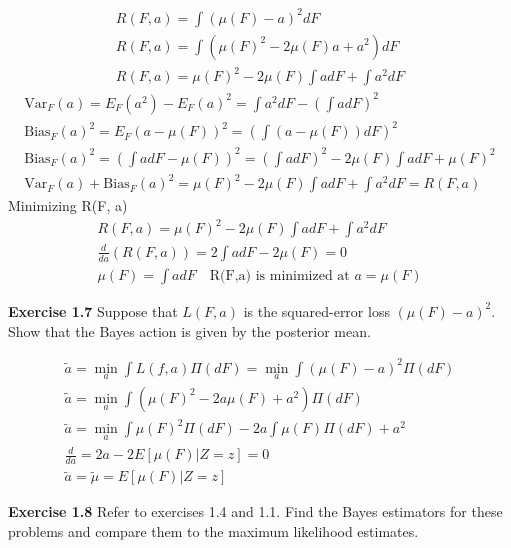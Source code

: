 \documentclass[12pt]{article}
\begin{document}
    \begin{gather*}
        R(F,a)  = \int (\mu(F) -a)^2 dF \\
        R(F,a)  = \int (\mu(F)^2 - 2 \mu (F) a + a ^2)dF\\
        R(F,a)  = \mu(F)^2 - 2 \mu (F) \int a dF +  \int a^2 dF
    \end{gather*}
    \hline
    \begin{gather*}
        \text{Var}_F (a)  = E_F ( a ^2) - E_F(a)^2 = \int a^2 dF - (\int a dF)^2\\
        \text{Bias}_F (a)^2 = E_F (a - \mu (F)) ^2 = (\int (a - \mu (F)) dF)^2 \\
        \text{Bias}_F (a)^2 = (\int a dF - \mu(F))^2 = (\int a dF)^2 - 2 \mu(F) \int a dF + \mu(F)^2 \\
        \text{Var}_F (a) + \text{Bias}_F (a)^2 = \mu(F)^2 - 2 \mu(F)\int a dF + \int a^2 dF = R(F,a)
    \end{gather*}
    \hline
    Minimizing R(F, a)
    \begin{gather*}
        R(F, a) = \mu(F)^2 - 2 \mu (F) \int a dF +  \int a^2 dF \\
        \frac{d} {da} (R(F,a)) = 2 \int a dF - 2 \mu (F) = 0 \\
        \mu(F) = \int a dF \quad \text{R(F,a) is  minimized at } a = \mu(F)
    \end{gather*}

    \noindent \textbf{Exercise 1.7}
    Suppose that \(L(F, a)\) is the squared-error loss \((\mu(F) - a)^2\). Show that the Bayes action is
    given by the posterior mean.
    
    \begin{gather*}
      \tilde{a}  = \min_a \int L(f, a) \Pi(dF) = \min_a \int (\mu(F) -a )^2 \Pi(dF)\\
      \tilde{a}  = \min_a \int (\mu(F)^2 - 2a \mu (F) + a^2) \Pi(dF) \\
      \tilde{a}  = \min_a \int \mu(F)^2\Pi(dF) - 2a \int \mu (F)\Pi(dF) + a^2 \\
       \frac{d} {da} = 2a - 2 E [\mu(F) | Z =z] = 0 \\
       \tilde{a}  = \tilde{\mu} = E[\mu(F)|Z=z]
    \end{gather*}

    \noindent \textbf{Exercise 1.8}
    Refer to exercises 1.4 and 1.1. Find the Bayes estimators for these problems and compare them to the maximum
    likelihood estimates.  \\
\end{document}
